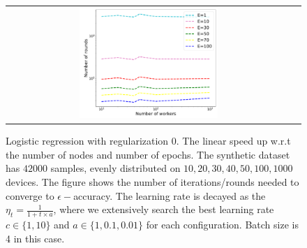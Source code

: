 \begin{figure}
\begin{tabular}{cc}
\includegraphics[width=0.5\textwidth]{fig/speedupNodesRounds-synthetic_logistic_regression_iclr300-epsilon07-b4-reg0-adapt0.pdf} \\
\end{tabular}
	\caption{Logistic regression with regularization $0$. The linear speed up w.r.t the number of nodes and number of epochs. The synthetic dataset has $42000$ samples, evenly distributed on $10, 20, 30, 40, 50, 100, 1000$ devices. The figure shows the number of iterations/rounds needed to converge to $\epsilon-$accuracy. The learning rate is decayed as the $\eta_t = \frac{1}{1 + t \times a}$, where we extensively search the best learning rate $c \in \{1, 10\}$ and $a \in \{1, 0.1, 0.01\}$ for each configuration. Batch size is 4 in this case.}
\end{figure}


